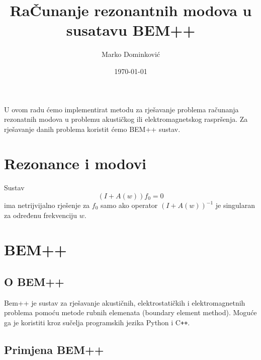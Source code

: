 \documentclass[a4paper,twoside,12pt]{memoir} %
\title{RaČunanje rezonantnih modova u susatavu BEM++}
\author{Marko Dominković}
\date{\monthyeardate\today}  %
\begin{document}
\frontmatter


\begin{intro}
U ovom radu ćemo implementirat metodu za rješavanje problema računanja rezonatnih modova u problemu akustičkog ili elektromagnetskog raspršenja. Za rješavanje danih problema koristit ćemo BEM++ sustav.    
\end{intro}

\chapter{Rezonance i modovi}	
Sustav 
\begin{equation}
\label{eq:Af=0}
(I+A(w))f_{0}=0
\end{equation}
ima netrijvijalno rješenje za $f_0$ samo ako operator $(I+A(w))^{-1}$ je singularan za određenu frekvenciju $w$.

\chapter{BEM++}	
\section{O BEM++}

\cite{bempp} Bem++ je sustav za rješavanje akustičnih, elektrostatičkih i elektromagnetnih problema pomoću metode rubnih elemenata (boundary element method). Moguće ga je koristiti kroz sučelja programskih jezika Python i C\texttt{++}.

\section{Primjena BEM++}
\end{document}

